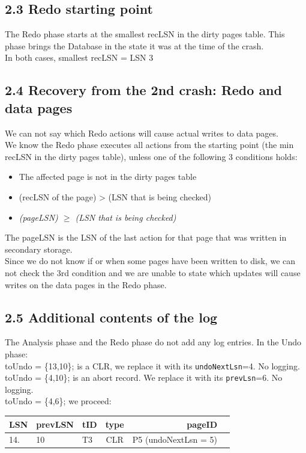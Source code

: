 \documentclass[paper=a4, fontsize=11pt]{scrartcl} %
\numberwithin{equation}{section} %
\numberwithin{figure}{section} %
\numberwithin{table}{section} %
\begin{document}
\subsection{2.3 Redo starting point}
The Redo phase starts at the smallest recLSN in the dirty pages table. This phase brings the Database in the state it was at the time of the crash.\\
In both cases, smallest recLSN = LSN 3

\subsection{2.4 Recovery from the 2nd crash: Redo and data pages}
We can not say which Redo actions will cause actual writes to data pages.\\
We know the Redo phase executes all actions from the starting point (the min recLSN in the dirty pages table), unless one of the following 3 conditions holds:
\begin{itemize}
\item The affected page is not in the dirty pages table
\item (recLSN of the page) > (LSN that is being checked) 
\item \textit{(pageLSN) $ \geq $ (LSN that is being checked)}
\end{itemize}
The pageLSN is the LSN of the last action for that page that was written in secondary storage.\\
Since we do not know if or when some pages have been written to disk, we can not check the 3rd condition and we are unable to state which updates will cause writes on the data pages in the Redo phase.

\subsection{2.5 Additional contents of the log} 
The Analysis phase and the Redo phase do not add any log entries. In the Undo phase:\\
toUndo = \{13,10\}; \quad {} is a CLR, we replace it with its \verb|undoNextLsn|=4. No logging.\\
toUndo = \{4,10\}; \quad {} is an abort record. We replace it with its \verb|prevLsn|=6. No logging.\\
toUndo = \{4,6\}; \quad \quad we proceed:
\begin{center}
  \begin{tabular}{| l | l | l | c | r | r| }
    \hline
    \textbf{LSN} & \textbf{prevLSN} & \textbf{tID} & \textbf{type} & \textbf{pageID} \\ \hline
    14. &  10 & T3 & CLR & P5 (undoNextLsn = 5) \\ \hline
  \end{tabular}
\end{center}
\end{document}
